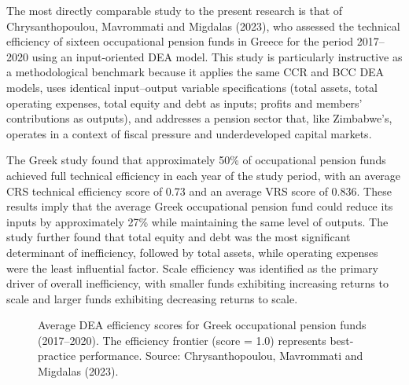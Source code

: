 \documentclass[12pt,a4paper]{article}
\begin{document}
The most directly comparable study to the present research is that of Chrysanthopoulou, Mavrommati and Migdalas (2023), who assessed the technical efficiency of sixteen occupational pension funds in Greece for the period 2017--2020 using an input-oriented DEA model. This study is particularly instructive as a methodological benchmark because it applies the same CCR and BCC DEA models, uses identical input--output variable specifications (total assets, total operating expenses, total equity and debt as inputs; profits and members' contributions as outputs), and addresses a pension sector that, like Zimbabwe's, operates in a context of fiscal pressure and underdeveloped capital markets.

The Greek study found that approximately 50\% of occupational pension funds achieved full technical efficiency in each year of the study period, with an average CRS technical efficiency score of 0.73 and an average VRS score of 0.836. These results imply that the average Greek occupational pension fund could reduce its inputs by approximately 27\% while maintaining the same level of outputs. The study further found that total equity and debt was the most significant determinant of inefficiency, followed by total assets, while operating expenses were the least influential factor. Scale efficiency was identified as the primary driver of overall inefficiency, with smaller funds exhibiting increasing returns to scale and larger funds exhibiting decreasing returns to scale.

\begin{figure}[H]
\centering
{}
\caption{Average DEA efficiency scores for Greek occupational pension funds (2017--2020). The efficiency frontier (score = 1.0) represents best-practice performance. Source: Chrysanthopoulou, Mavrommati and Migdalas (2023).}
\label{fig:greek_efficiency}
\end{figure}
\end{document}
